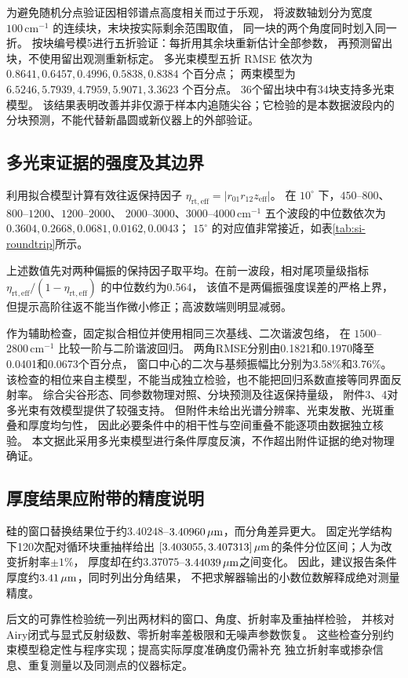 为避免随机分点验证因相邻谱点高度相关而过于乐观，
将波数轴划分为宽度 $100\,\mathrm{cm}^{-1}$ 的连续块，末块按实际剩余范围取值，
同一块的两个角度同时划入同一折。
按块编号模5进行五折验证：每折用其余块重新估计全部参数，
再预测留出块，不使用留出观测重新标定。
多光束模型五折 RMSE 依次为
$0.8641,0.6457,0.4996,0.5838,0.8384$ 个百分点；
两束模型为
$6.5246,5.7939,4.7959,5.9071,3.3623$ 个百分点。
36个留出块中有34块支持多光束模型。
该结果表明改善并非仅源于样本内追随尖谷；它检验的是本数据波段内的分块预测，不能代替新晶圆或新仪器上的外部验证。

\subsection{多光束证据的强度及其边界}
利用拟合模型计算有效往返保持因子
$\eta_{\mathrm{rt,eff}}=|r_{01}r_{12}z_{\mathrm{eff}}|$。
在 $10^\circ$ 下，$450$--$800$、
$800$--$1200$、$1200$--$2000$、
$2000$--$3000$、$3000$--$4000\,\mathrm{cm}^{-1}$
五个波段的中位数依次为
$0.3604,0.2668,0.0681,0.0162,0.0043$；
$15^\circ$ 的对应值非常接近，如表\ref{tab:si-roundtrip}所示。

上述数值先对两种偏振的保持因子取平均。在前一波段，相对尾项量级指标
$\eta_{\mathrm{rt,eff}}/(1-\eta_{\mathrm{rt,eff}})$ 的中位数约为0.564，
该值不是两偏振强度误差的严格上界，但提示高阶往返不能当作微小修正；高波数端则明显减弱。

作为辅助检查，固定拟合相位并使用相同三次基线、二次谐波包络，
在 $1500$--$2800\,\mathrm{cm}^{-1}$ 比较一阶与二阶谐波回归。
两角RMSE分别由0.1821和0.1970降至0.0401和0.0673个百分点，
窗口中心的二次与基频振幅比分别为3.58\%和3.76\%。
该检查的相位来自主模型，不能当成独立检验，也不能把回归系数直接等同界面反射率。
综合尖谷形态、同参数物理对照、分块预测及往返保持量级，
附件3、4对多光束有效模型提供了较强支持。
但附件未给出光谱分辨率、光束发散、光斑重叠和厚度均匀性，
因此必要条件中的相干性与空间重叠不能逐项由数据独立核验。
本文据此采用多光束模型进行条件厚度反演，不作超出附件证据的绝对物理确证。

\subsection{厚度结果应附带的精度说明}
硅的窗口替换结果位于约$3.40248$--$3.40960\,\mu\mathrm{m}$，而分角差异更大。
固定光学结构下120次配对循环块重抽样给出
$[3.403055,3.407313]\,\mu\mathrm{m}$的条件分位区间；人为改变折射率$\pm1\%$，
厚度却在约$3.37075$--$3.44039\,\mu\mathrm{m}$之间变化。
因此，建议报告条件厚度约$3.41\,\mu\mathrm{m}$，同时列出分角结果，
不把求解器输出的小数位数解释成绝对测量精度。

后文的可靠性检验统一列出两材料的窗口、角度、折射率及重抽样检验，
并核对Airy闭式与显式反射级数、零折射率差极限和无噪声参数恢复。
这些检查分别约束模型稳定性与程序实现；提高实际厚度准确度仍需补充
独立折射率或掺杂信息、重复测量以及同测点的仪器标定。
